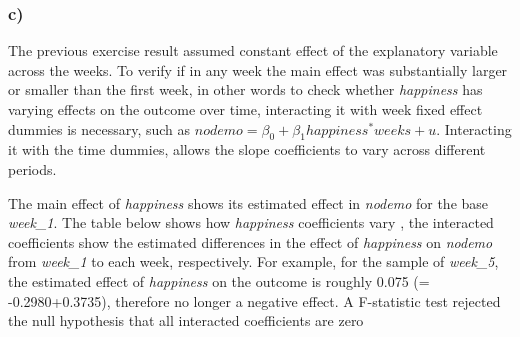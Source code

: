 \documentclass[
]{article}
\begin{document}
\hypertarget{c}{%
\subsubsection{c)}\label{c}}

The previous exercise result assumed constant effect of the explanatory
variable across the weeks. To verify if in any week the main effect was
substantially larger or smaller than the first week, in other words to
check whether \emph{happiness} has varying effects on the outcome over
time, interacting it with week fixed effect dummies is necessary, such
as \(nodemo = \beta_0 +\beta_1happiness^*weeks +u\). Interacting it with
the time dummies, allows the slope coefficients to vary across different
periods.

The main effect of \emph{happiness} shows its estimated effect in
\emph{nodemo} for the base \emph{week\_1}. The table below shows how
\emph{happiness} coefficients vary , the interacted coefficients show
the estimated differences in the effect of \emph{happiness} on
\emph{nodemo} from \emph{week\_1} to each week, respectively. For
example, for the sample of \emph{week\_5}, the estimated effect of
\emph{happiness} on the outcome is roughly 0.075 (= -0.2980+0.3735),
therefore no longer a negative effect. A F-statistic test rejected the
null hypothesis that all interacted coefficients are zero
\end{document}
